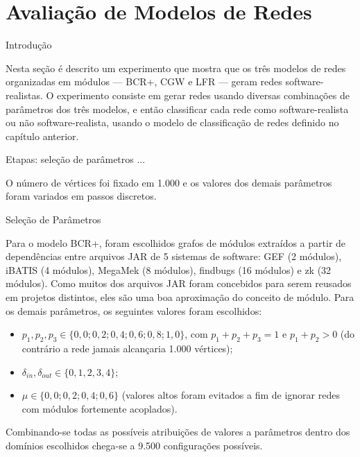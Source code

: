 \chapter{Avaliação de Modelos de Redes} \label{cap:avaliacao}

\begin{section}{Introdução}

Nesta seção é descrito um experimento que mostra que os três modelos de redes organizadas em módulos --- BCR+, CGW e LFR --- geram redes software-realistas. O experimento consiste em gerar redes usando diversas combinações de parâmetros dos três modelos, e então classificar cada rede como software-realista ou não software-realista, usando o modelo de classificação de redes definido no capítulo anterior. 

	Etapas: seleção de parâmetros ...

O número de vértices foi fixado em 1.000 e os valores dos demais parâmetros foram variados em passos discretos. 


\begin{subsection}{Seleção de Parâmetros} \label{sec:parametros}

Para o modelo BCR+, foram escolhidos grafos de módulos extraídos a partir de dependências entre arquivos JAR de 5 sistemas de software: GEF (2 módulos), iBATIS (4 módulos), MegaMek (8 módulos), findbugs (16 módulos) e zk (32 módulos). Como muitos dos arquivos JAR foram concebidos para serem reusados em projetos distintos, eles são uma boa aproximação do conceito de módulo. Para os demais parâmetros, os seguintes valores foram escolhidos:

\begin{itemize}
	\item $p_1, p_2, p_3 \in \{0,0; 0,2; 0,4; 0,6; 0,8; 1,0\}$, com $p_1 + p_2 + p_3 = 1$ e $p_1 + p_2 > 0$ (do contrário a rede jamais alcançaria 1.000 vértices);
	\item $\delta_{in}, \delta_{out} \in \{0, 1, 2, 3, 4\}$;
	\item $\mu \in \{0,0; 0,2; 0,4; 0,6\}$ (valores altos foram evitados a fim de ignorar redes com módulos fortemente acoplados).
\end{itemize}

Combinando-se todas as possíveis atribuições de valores a parâmetros dentro dos domínios escolhidos chega-se a 9.500 configurações possíveis.


\end{subsection}
\end{section}
